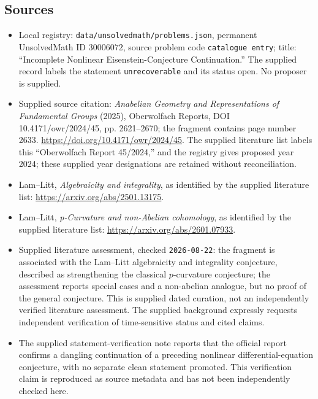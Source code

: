 \documentclass[11pt]{article}
\begin{document}
\subsection{Sources}
\begin{itemize}
\item Local registry: \texttt{data/unsolvedmath/problems.json}, permanent UnsolvedMath ID \(30006072\), source problem code \texttt{catalogue entry}; title: ``Incomplete Nonlinear Eisenstein-Conjecture Continuation.'' The supplied record labels the statement \texttt{unrecoverable} and its status open. No proposer is supplied.
\item Supplied source citation: \emph{Anabelian Geometry and Representations of Fundamental Groups} (2025), Oberwolfach Reports, DOI 10.4171/owr/2024/45, pp. 2621--2670; the fragment contains page number 2633. \url{https://doi.org/10.4171/owr/2024/45}. The supplied literature list labels this ``Oberwolfach Report 45/2024,'' and the registry gives proposed year 2024; these supplied year designations are retained without reconciliation.
\item Lam--Litt, \emph{Algebraicity and integrality}, as identified by the supplied literature list: \url{https://arxiv.org/abs/2501.13175}.
\item Lam--Litt, \emph{p-Curvature and non-Abelian cohomology}, as identified by the supplied literature list: \url{https://arxiv.org/abs/2601.07933}.
\item Supplied literature assessment, checked \texttt{2026-08-22}: the fragment is associated with the Lam--Litt algebraicity and integrality conjecture, described as strengthening the classical \(p\)-curvature conjecture; the assessment reports special cases and a non-abelian analogue, but no proof of the general conjecture. This is supplied dated curation, not an independently verified literature assessment. The supplied background expressly requests independent verification of time-sensitive status and cited claims.
\item The supplied statement-verification note reports that the official report confirms a dangling continuation of a preceding nonlinear differential-equation conjecture, with no separate clean statement promoted. This verification claim is reproduced as source metadata and has not been independently checked here.
\end{itemize}
\end{document}
